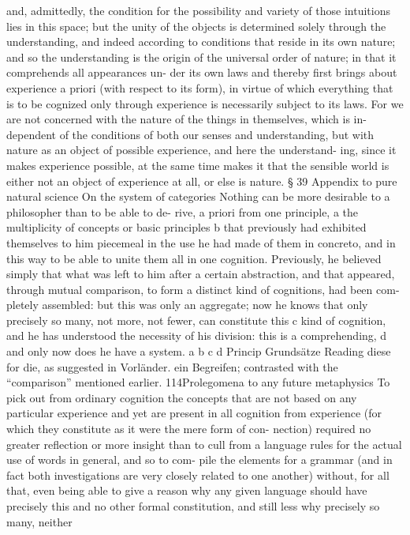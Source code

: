and, admittedly, the condition for the possibility and variety of those
intuitions lies in this space; but the unity of the objects is determined
solely through the understanding, and indeed according to conditions
that reside in its own nature; and so the understanding is the origin of
the universal order of nature; in that it comprehends all appearances un-
der its own laws and thereby ﬁrst brings about experience a priori (with
respect to its form), in virtue of which everything that is to be cognized
only through experience is necessarily subject to its laws. For we are
not concerned with the nature of the things in themselves, which is in-
dependent of the conditions of both our senses and understanding, but
with nature as an object of possible experience, and here the understand-
ing, since it makes experience possible, at the same time makes it that
the sensible world is either not an object of experience at all, or else is
nature.
§ 39
Appendix to pure natural science
On the system of categories
Nothing can be more desirable to a philosopher than to be able to de-
rive, a priori from one principle, a the multiplicity of concepts or basic
principles b that previously had exhibited themselves to him piecemeal
in the use he had made of them in concreto, and in this way to be able to
unite them all in one cognition. Previously, he believed simply that what
was left to him after a certain abstraction, and that appeared, through
mutual comparison, to form a distinct kind of cognitions, had been com-
pletely assembled: but this was only an aggregate; now he knows that
only precisely so many, not more, not fewer, can constitute this c kind of
cognition, and he has understood the necessity of his division: this is a
comprehending, d and only now does he have a system.
a
b
c
d
Princip
Grundsätze
Reading diese for die, as suggested in Vorländer.
ein Begreifen; contrasted with the “comparison” mentioned earlier.
114Prolegomena to any future metaphysics
To pick out from ordinary cognition the concepts that are not based
on any particular experience and yet are present in all cognition from
experience (for which they constitute as it were the mere form of con-
nection) required no greater reﬂection or more insight than to cull from
a language rules for the actual use of words in general, and so to com-
pile the elements for a grammar (and in fact both investigations are very
closely related to one another) without, for all that, even being able to
give a reason why any given language should have precisely this and no
other formal constitution, and still less why precisely so many, neither
